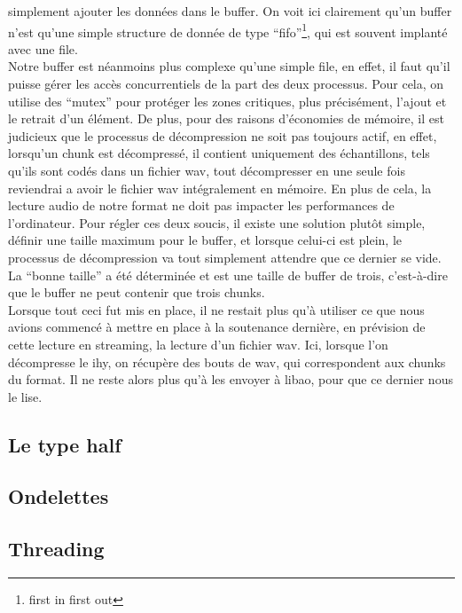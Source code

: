 \documentclass[a4paper,12pt]{article}
\begin{document}
simplement ajouter les données dans le buffer. On voit ici clairement qu'un
buffer n'est qu'une simple structure de donnée de type ``fifo''\footnote{first
in first out}, qui est souvent implanté avec une file.\\
Notre buffer est néanmoins plus complexe qu'une simple file, en effet, il faut
qu'il puisse gérer les accès concurrentiels de la part des deux processus. Pour
cela, on utilise des ``mutex'' pour protéger les zones critiques, plus
précisément, l'ajout et le retrait d'un élément. De plus, pour des raisons
d'économies de mémoire, il est judicieux que le processus de décompression ne
soit pas toujours actif, en effet, lorsqu'un chunk est décompressé, il contient
uniquement des échantillons, tels qu'ils sont codés dans un fichier wav, tout
décompresser en une seule fois reviendrai a avoir le fichier wav intégralement
en mémoire. En plus de cela, la lecture audio de notre format ne doit pas
impacter les performances de l'ordinateur. Pour régler ces deux soucis, il
existe une solution plutôt simple, définir une taille maximum pour le buffer, et
lorsque celui-ci est plein, le processus de décompression va tout simplement
attendre que ce dernier se vide. La ``bonne taille'' a été déterminée et est une
taille de buffer de trois, c'est-à-dire que le buffer ne peut contenir que
trois chunks.\\
Lorsque tout ceci fut mis en place, il ne restait plus qu'à utiliser ce que nous
avions commencé à mettre en place à la soutenance dernière, en prévision de
cette lecture en streaming, la lecture d'un fichier wav. Ici, lorsque l'on
décompresse le ihy, on récupère des bouts de wav, qui correspondent aux chunks
du format. Il ne reste alors plus qu'à les envoyer à libao, pour que ce dernier
nous le lise.
	\subsection{Le type half}
	\subsection{Ondelettes}
	\subsection{Threading}
\end{document}
